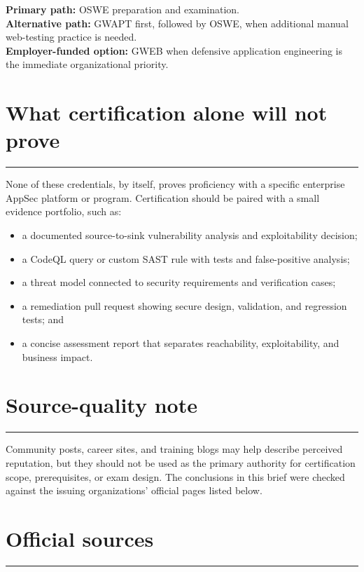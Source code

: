 \documentclass[11pt]{article}
\newcommand{\sectionrule}{\vspace{-2pt}\color{Rule}\rule{\linewidth}{0.6pt}\color{black}\vspace{2pt}}
\begin{document}
\begin{tcolorbox}[
  enhanced,
  colback=Sky,
  colframe=Blue,
  boxrule=0.8pt,
  arc=1.5mm,
  title={\bfseries Recommended certification sequence},
  coltitle=Navy,
  fonttitle=\bfseries]
\textbf{Primary path:} OSWE preparation and examination.\\[3pt]
\textbf{Alternative path:} GWAPT first, followed by OSWE, when additional manual
web-testing practice is needed.\\[3pt]
\textbf{Employer-funded option:} GWEB when defensive application engineering is
the immediate organizational priority.
\end{tcolorbox}

\section*{What certification alone will not prove}
\sectionrule

None of these credentials, by itself, proves proficiency with a specific
enterprise AppSec platform or program. Certification should be paired with a
small evidence portfolio, such as:

\begin{itemize}
  \item a documented source-to-sink vulnerability analysis and exploitability decision;
  \item a CodeQL query or custom SAST rule with tests and false-positive analysis;
  \item a threat model connected to security requirements and verification cases;
  \item a remediation pull request showing secure design, validation, and regression tests; and
  \item a concise assessment report that separates reachability, exploitability, and business impact.
\end{itemize}

\section*{Source-quality note}
\sectionrule

Community posts, career sites, and training blogs may help describe perceived
reputation, but they should not be used as the primary authority for certification
scope, prerequisites, or exam design. The conclusions in this brief were checked
against the issuing organizations' official pages listed below.

\section*{Official sources}
\sectionrule
\end{document}
